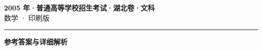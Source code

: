 \documentclass[zihao=5, a4paper]{ctexart}
\begin{document}
\begin{center}
  {\Large\bfseries 2005 年·普通高等学校招生考试·湖北卷·文科}\\[4pt]
  {\large 数学 · 印刷版}
\end{center}
\medskip
{}

\par\bigskip\hrule\bigskip
{}
\begin{center}{\large\bfseries 参考答案与详细解析}\end{center}
\smallskip

\end{document}
